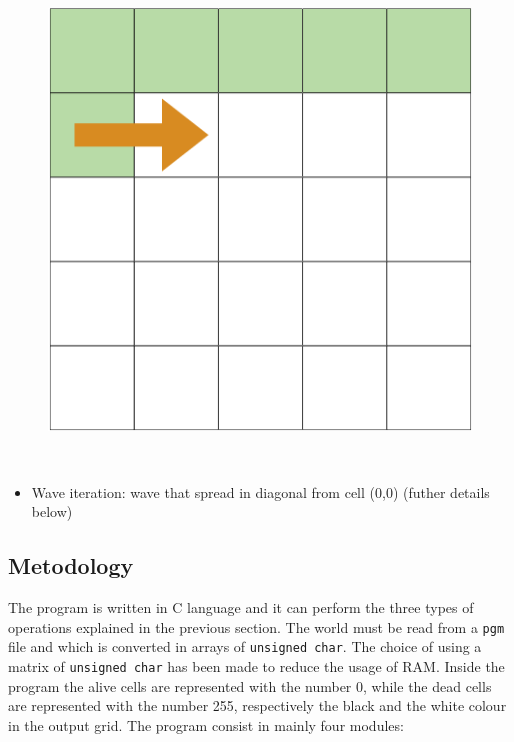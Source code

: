 \documentclass[
  letterpaper,
  DIV=11,
  numbers=noendperiod]{scrartcl}
\providecommand{\tightlist}{%
  \setlength{\itemsep}{0pt}\setlength{\parskip}{0pt}}\usepackage{longtable,booktabs,array}
\begin{document}
\begin{figure}
\begin{minipage}[t]{0.25\linewidth}
{{\includegraphics{img/iterate_ordered_intro_2.png}

}

}

\end{minipage}%
%
\begin{minipage}[t]{0.20\linewidth}

{\centering 

~

}

\end{minipage}%

\end{figure}

\begin{itemize}
\tightlist
\item
  Wave iteration: wave that spread in diagonal from cell (0,0) (futher
  details below)
\end{itemize}

\hypertarget{metodology}{%
\subsection{Metodology}\label{metodology}}

The program is written in C language and it can perform the three types
of operations explained in the previous section. The world must be read
from a \texttt{pgm} file and which is converted in arrays of
\texttt{unsigned\ char}. The choice of using a matrix of
\texttt{unsigned\ char} has been made to reduce the usage of RAM. Inside
the program the alive cells are represented with the number 0, while the
dead cells are represented with the number 255, respectively the black
and the white colour in the output grid. The program consist in mainly
four modules:
\end{document}
